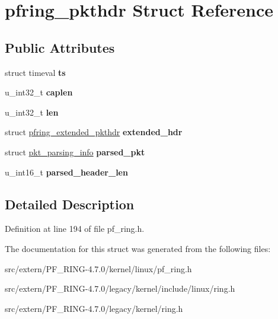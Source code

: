 \hypertarget{structpfring__pkthdr}{
\section{pfring\_\-pkthdr Struct Reference}
\label{structpfring__pkthdr}
}
\subsection*{Public Attributes}
\begin{DoxyCompactItemize}
\item 
\hypertarget{structpfring__pkthdr_ab1a292fc58bffe6bfd5854ea0aaf3ed0}{
struct timeval {\bfseries ts}}
\label{structpfring__pkthdr_ab1a292fc58bffe6bfd5854ea0aaf3ed0}

\item 
\hypertarget{structpfring__pkthdr_a770c57a86e2330f2c90c43a54d876020}{
u\_\-int32\_\-t {\bfseries caplen}}
\label{structpfring__pkthdr_a770c57a86e2330f2c90c43a54d876020}

\item 
\hypertarget{structpfring__pkthdr_a0b86e49759a21c037c4308658144444d}{
u\_\-int32\_\-t {\bfseries len}}
\label{structpfring__pkthdr_a0b86e49759a21c037c4308658144444d}

\item 
\hypertarget{structpfring__pkthdr_abcf5157d14838bec6f293f90bdf664f7}{
struct \hyperlink{structpfring__extended__pkthdr}{pfring\_\-extended\_\-pkthdr} {\bfseries extended\_\-hdr}}
\label{structpfring__pkthdr_abcf5157d14838bec6f293f90bdf664f7}

\item 
\hypertarget{structpfring__pkthdr_a0a884cb6e87f98e06b435189f69209ba}{
struct \hyperlink{structpkt__parsing__info}{pkt\_\-parsing\_\-info} {\bfseries parsed\_\-pkt}}
\label{structpfring__pkthdr_a0a884cb6e87f98e06b435189f69209ba}

\item 
\hypertarget{structpfring__pkthdr_ad491e283ba9ada9e4e0851fdf6653667}{
u\_\-int16\_\-t {\bfseries parsed\_\-header\_\-len}}
\label{structpfring__pkthdr_ad491e283ba9ada9e4e0851fdf6653667}

\end{DoxyCompactItemize}


\subsection{Detailed Description}


Definition at line 194 of file pf\_\-ring.h.



The documentation for this struct was generated from the following files:\begin{DoxyCompactItemize}
\item 
src/extern/PF\_\-RING-\/4.7.0/kernel/linux/pf\_\-ring.h\item 
src/extern/PF\_\-RING-\/4.7.0/legacy/kernel/include/linux/ring.h\item 
src/extern/PF\_\-RING-\/4.7.0/legacy/kernel/ring.h\end{DoxyCompactItemize}

